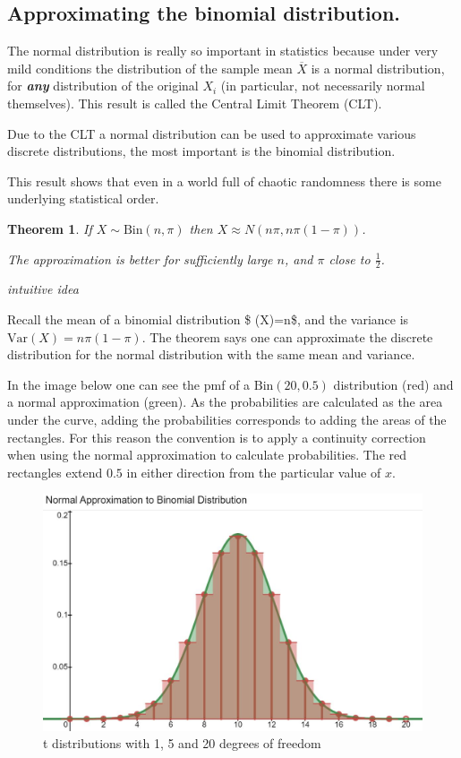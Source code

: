 \documentclass[
]{book}
\newtheorem{theorem}{Theorem}[chapter]
\theoremstyle{definition}
\theoremstyle{definition}
\theoremstyle{definition}
\theoremstyle{definition}
\theoremstyle{remark}
\begin{document}
\hypertarget{approximating-the-binomial-distribution.}{%
\subsection{Approximating the binomial distribution.}\label{approximating-the-binomial-distribution.}}

The normal distribution is really so important in statistics because under very mild conditions the distribution of the sample mean \(\overline{X}\) is a normal distribution, for \textbf{\emph{any}} distribution of the original \(X_i\) (in particular, not necessarily normal themselves). This result is called the Central Limit Theorem (CLT).

Due to the CLT a normal distribution can be used to approximate various discrete distributions, the most important is the binomial distribution.

This result shows that even in a world full of chaotic randomness there is some underlying statistical order.

\begin{theorem}
If \(X\sim \text{Bin}(n,\pi)\) then \(X\approx N(n\pi,n\pi(1-\pi))\).

The approximation is better for sufficiently large \(n\), and \(\pi\) close to \(\frac{1}{2}\).
\end{theorem}

\emph{intuitive idea}

Recall the mean of a binomial distribution \$ (X)=n\pi\$, and the variance is \(\text{Var}(X)=n\pi(1-\pi)\). The theorem says one can approximate the discrete distribution for the normal distribution with the same mean and variance.

In the image below one can see the pmf of a \(\text{Bin}(20,0.5)\) distribution (red) and a normal approximation (green). As the probabilities are calculated as the area under the curve, adding the probabilities corresponds to adding the areas of the rectangles. For this reason the convention is to apply a continuity correction when using the normal approximation to calculate probabilities. The red rectangles extend \(0.5\) in either direction from the particular value of \(x\).

\begin{figure}

{\centering \includegraphics[width=0.75\linewidth]{./figures/normapprox} 

}

\caption{t distributions with 1, 5 and 20 degrees of freedom}\label{fig:napprox}
\end{figure}
\end{document}
